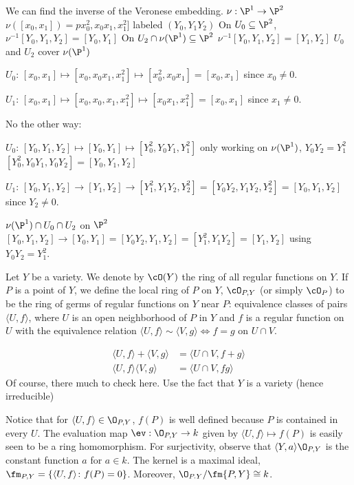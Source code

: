 \begin{ex}
We can find the inverse of the Veronese embedding. $\nu: \P^1 \to \P^2$
$\nu([x_0,x_1])= px_0^2,x_0x_1,x_1^2]$ labeled $(Y_0,Y_1Y_2)$
On $U_0 \subseteq \P^2$, 
$\nu^{-1}[Y_0,Y_1,Y_2]= [Y_0,Y_1]$
On $U_2 \cap \nu(\P^1) \subseteq \P^2$
$\nu^{-1}[Y_0,Y_1,Y_2]= [Y_1,Y_2]$
$U_0$ and $U_2$ cover $\nu(\P^1)$

$U_0$: $[x_0,x_1] \mapsto [x_0,x_0x_1,x_1^2] \mapsto [x_0^2,x_0x_1]= [x_0,x_1]$ since $x_0 \neq 0$. 

$U_1$: $[x_0,x_1] \mapsto [x_0,x_0,x_1,x_1^2] \mapsto [x_0x_1,x_1^2]= [x_0,x_1]$ since $x_1 \neq 0$. 


No the other way:

$U_0$: $[Y_0,Y_1,Y_2] \mapsto [Y_0,Y_1] \mapsto [Y_0^2,Y_0Y_1,Y_1^2]$ only working on $\nu(\P^1)$, $Y_0Y_2= Y_1^2$
$[Y_0^2,Y_0Y_1,Y_0Y_2]= [Y_0,Y_1,Y_2]$

$U_1$: $[Y_0,Y_1,Y_2] \to [Y_1,Y_2] \to [Y_1^2,Y_1Y_2,Y_2^2]= [Y_0Y_2,Y_1Y_2,Y_2^2]= [Y_0,Y_1,Y_2]$ since $Y_2 \neq 0$. 

$\nu(\P^1) \cap U_0 \cap U_2$ on $\P^2$
$[Y_0,Y_1,Y_2] \to [Y_0,Y_1]= [Y_0Y_2,Y_1,Y_2]= [Y_1^2,Y_1Y_2] = [Y_1,Y_2]$ using $Y_0Y_2=Y_1^2$. 
\end{ex}


\begin{dfn}
Let $Y$ be a variety. We denote by $\cO(Y)$ the ring of all regular functions on $Y$. If $P$ is a point of $Y$, we define the local ring of $P$ on $Y$, $\cO_{P,Y}$ (or simply $\cO_P$) to be the ring of germs of regular functions on $Y$ near $P$: equivalence classes of pairs $\langle U,f \rangle$, where $U$ is an open neighborhood of $P$ in $Y$ and $f$ is a regular function on $U$ with the equivalence relation $\langle U,f \rangle \sim \langle V,g \rangle \Leftrightarrow f=g \text{ on } U \cap V$.
\end{dfn}

	\[
	\begin{split}
	\langle U,f \rangle + \langle V,g \rangle&= \langle U \cap V, f+g \rangle \\
	\langle U,f \rangle \langle V,g \rangle&= \langle U \cap V, fg \rangle 
	\end{split}
	\]
Of course, there much to check here. Use the fact that $Y$ is a variety (hence irreducible)




Notice that for $\langle U,f \rangle \in \O_{P,Y}$, $f(P)$ is well defined because $P$ is contained in every $U$. The evaluation map $\ev: \O_{P,Y} \to k$ given by $\langle U,f \rangle \mapsto f(P)$ is easily seen to be a ring homomorphism. For surjectivity, observe that $\langle Y, a \rangle \O_{P,Y}$ is the constant function $a$ for $a \in k$. The kernel is a maximal ideal, $\fm_{P,Y}= \{ \langle U,f \rangle \colon f(P)=0 \}$. Moreover, $\O_{P.Y}/ \fm{P,Y} \cong k$. 


